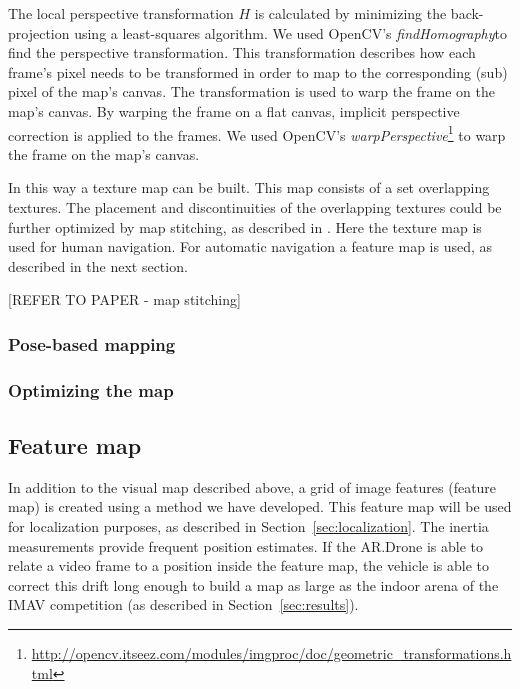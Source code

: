 The local perspective transformation $H$ is calculated by minimizing the back-projection using a least-squares algorithm.
We used OpenCV's \textit{findHomography}\footnotemark[3] to find the perspective transformation.
This transformation describes how each frame's pixel needs to be transformed in order to map to the corresponding (sub) pixel of the map's canvas.
The transformation is used to warp the frame on the map's canvas.
By warping the frame on a flat canvas, implicit perspective correction is applied to the frames.
We used OpenCV's \textit{warpPerspective}\footnote{\url{http://opencv.itseez.com/modules/imgproc/doc/geometric_transformations.html}} to warp the frame on the map's canvas.

In this way a texture map can be built. This map consists of a set overlapping textures. The placement and discontinuities of the overlapping textures could be further optimized by map stitching, as described in \cite{Visser2011imav}. Here the texture map is used for human navigation. For automatic navigation a feature map is used, as described in the next section.

[REFER TO PAPER - map stitching]

			\subsubsection{Pose-based mapping}
			\subsubsection{Optimizing the map}


		\subsection{Feature map}
\label{sec:feature_map}
In addition to the visual map described above, a grid of image features (feature map) is created using a method we have developed.
This feature map will be used for localization purposes, as described in Section~\ref{sec:localization}.
The inertia measurements provide frequent position estimates.
If the AR.Drone is able to relate a video frame to a position inside the feature map, the vehicle is able to correct this drift long enough to build a map 
as large as the indoor arena of the IMAV competition (as described in Section~\ref{sec:results}).


